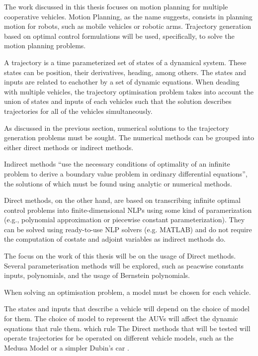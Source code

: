 \par The work discussed in this thesis focuses on motion planning for multiple cooperative vehicles. Motion Planning, as the name suggests, consists in planning motion for robots, such as mobile vehicles or robotic arms. Trajectory generation based on optimal control formulations will be used, specifically, to solve the motion planning problems. 
\par A trajectory is a time parameterized set of states of a dynamical system. These states can be position, their derivatives, heading, among others. The states and inputs are related to eachother by a set of dynamic equations. When deading with multiple vehicles, the trajectory optimisation problem takes into account the union of states and inputs of each vehicles such that the solution describes trajectories for all of the vehicles simultaneously.
\par As discussed in the previous section, numerical solutions to the trajectory generation problems must be sought. The numerical methods can be grouped into either direct methods or indirect methods. 
\par Indirect methods “use the necessary conditions of optimality of an infinite problem to derive a boundary value problem in ordinary differential equations”, the solutions of which must be found using analytic or numerical methods. 
\par Direct methods, on the other hand, are based on transcribing infinite optimal control problems into finite-dimensional \acp{NLP} using some kind of paramerization (e.g., polynomial approximation or piecewise constant parameterization). They can be solved using ready-to-use NLP solvers (e.g. MATLAB) and do not require the computation of costate and adjoint variables as indirect methods do.
\par The focus on the work of this thesis will be on the usage of Direct methods. Several parameterisation methods will be explored, such as peacwise constants inputs, polynomials, and the usage of Bernstein polynomials.
\par When solving an optimisation problem, a model must be chosen for each vehicle. 


The states and inputs that describe a vehicle will depend on the choice of model for them. The choice of model to represent the \acp{AUV} will affect the dynamic equations that rule them.    which rule The Direct methods that will be tested will operate trajectories for be operated on different vehicle models, such as the Medusa Model \cite{abreu2016medusa} or a simpler Dubin's car \cite{wiki:dubincar}.


